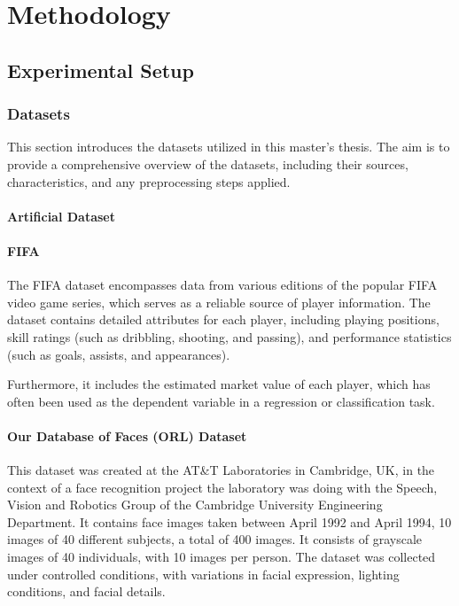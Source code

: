 \chapter{Methodology}





\section{Experimental Setup}

\subsection{Datasets}
This section introduces the datasets utilized in this master's thesis. The aim is to provide a comprehensive overview of the datasets, including their sources, characteristics, and any preprocessing steps applied.

\subsubsection{Artificial Dataset}\label{section:artificial-dataset}

\subsubsection{FIFA}\label{section:fifa-dataset}
The FIFA dataset encompasses data from various editions of the popular FIFA video game series, which serves as a reliable source of player information. The dataset contains detailed attributes for each player, including playing positions, skill ratings (such as dribbling, shooting, and passing), and performance statistics (such as goals, assists, and appearances).

Furthermore, it includes the estimated market value of each player, which has often been used as the dependent variable in a regression or classification task.

\subsubsection{Our Database of Faces (ORL) Dataset}\label{section:orl-dataset}
This dataset \cite{orl_dataset} was created at the AT\&T Laboratories in Cambridge, UK, in the context of a face recognition project the laboratory was doing with the Speech, Vision and Robotics Group of the Cambridge University Engineering Department. It contains face images taken between April 1992 and April 1994, 10 images of 40 different subjects, a total of 400 images. It consists of grayscale images of 40 individuals, with 10 images per person. The dataset was collected under controlled conditions, with variations in facial expression, lighting conditions, and facial details.

